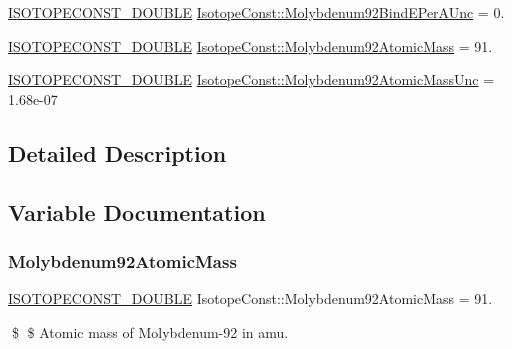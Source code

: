 \begin{DoxyCompactItemize}
\mbox{\hyperlink{group___isotope_const-_macros_ga8f45a7272ce02c0b4c65c44636ed719a}{I\+S\+O\+T\+O\+P\+E\+C\+O\+N\+S\+T\+\_\+\+D\+O\+U\+B\+LE}} \mbox{\hyperlink{group___isotope_const-_molybdenum-_mo92_ga606b0387d580482291a11cd01eb34ed7}{Isotope\+Const\+::\+Molybdenum92\+Bind\+E\+Per\+A\+Unc}} = 0.
\item 
\mbox{\hyperlink{group___isotope_const-_macros_ga8f45a7272ce02c0b4c65c44636ed719a}{I\+S\+O\+T\+O\+P\+E\+C\+O\+N\+S\+T\+\_\+\+D\+O\+U\+B\+LE}} \mbox{\hyperlink{group___isotope_const-_molybdenum-_mo92_ga80e55395c8b081cb05b30d39349714c4}{Isotope\+Const\+::\+Molybdenum92\+Atomic\+Mass}} = 91.
\item 
\mbox{\hyperlink{group___isotope_const-_macros_ga8f45a7272ce02c0b4c65c44636ed719a}{I\+S\+O\+T\+O\+P\+E\+C\+O\+N\+S\+T\+\_\+\+D\+O\+U\+B\+LE}} \mbox{\hyperlink{group___isotope_const-_molybdenum-_mo92_ga108ceae1ca83b6b57d9054e569513e18}{Isotope\+Const\+::\+Molybdenum92\+Atomic\+Mass\+Unc}} = 1.\+68e-\/07
\end{DoxyCompactItemize}


\subsection{Detailed Description}


\subsection{Variable Documentation}
\mbox{\label{group___isotope_const-_molybdenum-_mo92_ga80e55395c8b081cb05b30d39349714c4}} 
\subsubsection{\texorpdfstring{Molybdenum92\+Atomic\+Mass}{Molybdenum92AtomicMass}}
{\footnotesize\ttfamily \mbox{\hyperlink{group___isotope_const-_macros_ga8f45a7272ce02c0b4c65c44636ed719a}{I\+S\+O\+T\+O\+P\+E\+C\+O\+N\+S\+T\+\_\+\+D\+O\+U\+B\+LE}} Isotope\+Const\+::\+Molybdenum92\+Atomic\+Mass = 91.}

\$ \$ Atomic mass of Molybdenum-\/92 in amu. \mbox{\label{group___isotope_const-_molybdenum-_mo92_ga108ceae1ca83b6b57d9054e569513e18}} 
